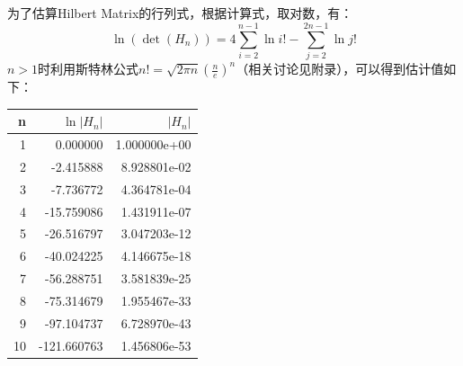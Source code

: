 \documentclass{ctexart}
\begin{document}
    \subsection{}
    为了估算Hilbert Matrix的行列式，根据计算式，取对数，有：
    $$\ln{(\det{(H_n)})}=4\sum_{i=2}^{n-1}{\ln{i!}}-\sum_{j=2}^{2n-1}{\ln{j!}}$$
    $n>1$时利用斯特林公式$n!=\sqrt{2\pi n}{(\frac{n}{e})^n}$（相关讨论见附录），可以得到估计值如下：
    \begin{table}[htbp]
        \centering
        \begin{tabular}{rrr}
            \toprule
             n &     $\ln{|H_n|}$ &           $|H_n|$ \\
            \midrule
            1 &    0.000000 &  1.000000e+00 \\
            2 &   -2.415888 &  8.928801e-02 \\
            3 &   -7.736772 &  4.364781e-04 \\
            4 &  -15.759086 &  1.431911e-07 \\
            5 &  -26.516797 &  3.047203e-12 \\
            6 &  -40.024225 &  4.146675e-18 \\
            7 &  -56.288751 &  3.581839e-25 \\
            8 &  -75.314679 &  1.955467e-33 \\
            9 &  -97.104737 &  6.728970e-43 \\
            10 & -121.660763 &  1.456806e-53 \\
            \bottomrule
            \end{tabular}
    \end{table}
\end{document}
